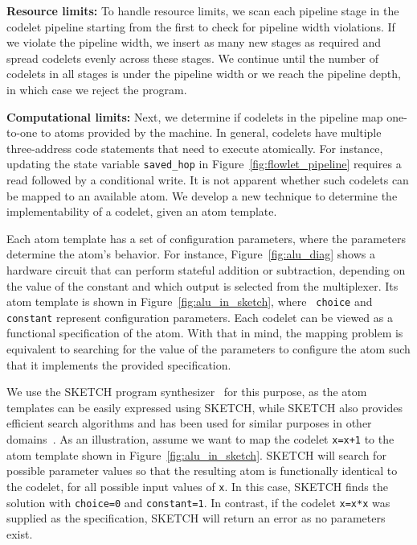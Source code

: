 \textbf{Resource limits:} To handle resource limits, we scan each pipeline
stage in the codelet pipeline starting from the first to check for pipeline
width violations.  If we violate the pipeline width, we insert as many new
stages as required and spread codelets evenly across these stages.  We continue
until the number of codelets in all stages is under the pipeline width or we
reach the pipeline depth, in which case we reject the program.

\textbf{Computational limits:} Next, we determine if codelets in the pipeline
map one-to-one to atoms provided by the \absmachine machine. In general,
codelets have multiple three-address code statements that need to execute
atomically. For instance, updating the state variable \texttt{saved\_hop} in
Figure~\ref{fig:flowlet_pipeline} requires a read followed by a conditional
write.  It is not apparent whether such codelets can be mapped to an available
atom. We develop a new technique to determine the implementability of a codelet,
given an atom template.

Each atom template has a set of configuration parameters, where the parameters
determine the atom's behavior.  For instance, Figure~\ref{fig:alu_diag} shows a
hardware circuit that can perform stateful addition or subtraction, depending
on the value of the constant and which output is selected from the multiplexer.
Its atom template is shown in Figure~\ref{fig:alu_in_sketch}, where {\tt
choice} and {\tt constant} represent configuration parameters.  Each codelet
can be viewed as a functional specification of the atom.  With that in mind,
the mapping problem is equivalent to searching for the value of the parameters
to configure the atom such that it implements the provided specification.

We use the SKETCH program synthesizer~\cite{sketch_asplos} for this purpose, as
the atom templates can be easily expressed using SKETCH, while SKETCH also
provides efficient search algorithms and has been used for similar purposes in
other domains~\cite{bitstreaming, lifejoin, qbs, chlorophyll}.  As an
illustration, assume we want to map the codelet {\tt x=x+1} to the atom
template shown in Figure~\ref{fig:alu_in_sketch}. SKETCH will search for
possible parameter values so that the resulting atom is functionally identical
to the codelet, for all possible input values of {\tt x}.  In this case, SKETCH
finds the solution with {\tt choice=0} and {\tt constant=1}.  In contrast, if
the codelet {\tt x=x*x} was supplied as the specification, SKETCH will return
an error as no parameters exist.


